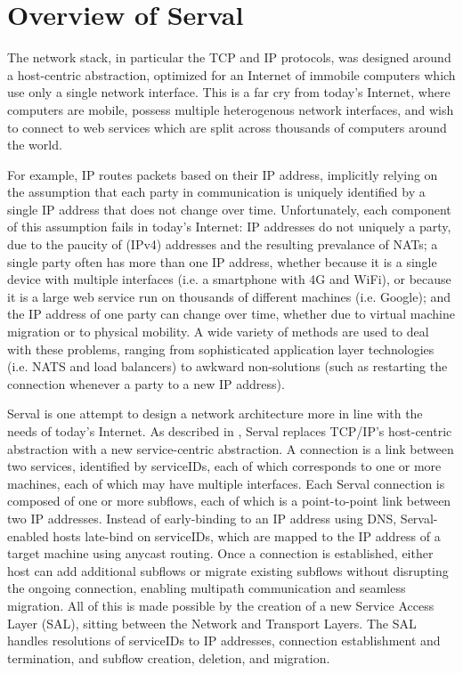 \section{Overview of Serval}
\label{sec:serval}

The network stack, in particular the TCP and IP protocols, was designed around a host-centric abstraction, optimized for an Internet of immobile computers which use only a single network interface. This is a far cry from today's Internet, where computers are mobile, possess multiple heterogenous network interfaces, and wish to connect to web services which are split across thousands of computers around the world. 

For example, IP routes packets based on their IP address, implicitly relying on the assumption that each party in communication is uniquely identified by a single IP address that does not change over time. Unfortunately, each component of this assumption fails in today's Internet: IP addresses do not uniquely a party, due to the paucity of (IPv4) addresses and the resulting prevalance of NATs; a single party often has more than one IP address, whether because it is a single device with multiple interfaces (i.e. a smartphone with 4G and WiFi), or because it is a large web service run on thousands of different machines (i.e. Google); and the IP address of one party can change over time, whether due to virtual machine migration or to physical mobility. A wide variety of methods are used to deal with these problems, ranging from sophisticated application layer technologies (i.e. NATS and load balancers) to awkward non-solutions (such as restarting the connection whenever a party to a new IP address).

Serval is one attempt to design a network architecture more in line with the needs of today's Internet. As described in \cite{nordstrom2012serval}, Serval replaces TCP/IP's host-centric abstraction with a new service-centric abstraction. A connection is a link between two services, identified by serviceIDs, each of which corresponds to one or more machines, each of which may have multiple interfaces. Each Serval connection is composed of one or more subflows, each of which is a point-to-point link between two IP addresses. Instead of early-binding to an IP address using DNS, Serval-enabled hosts late-bind on serviceIDs, which are mapped to the IP address of a target machine using anycast routing. Once a connection is established, either host can add additional subflows or migrate existing subflows without disrupting the ongoing connection, enabling multipath communication and seamless migration. All of this is made possible by the creation of a new Service Access Layer (SAL), sitting between the Network and Transport Layers. The SAL handles resolutions of serviceIDs to IP addresses, connection establishment and termination, and subflow creation, deletion, and migration. 

